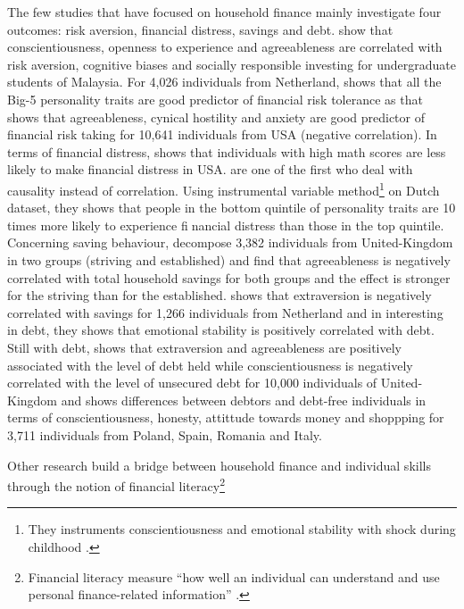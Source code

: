 \documentclass[a4paper, 11pt, onecolumn]{article}
\begin{document}
The few studies that have focused on household finance mainly investigate four outcomes: risk aversion, financial distress, savings and debt.
\cite{Nga2013} show that conscientiousness, openness to experience and agreeableness are correlated with risk aversion, cognitive biases and socially responsible investing for undergraduate students of Malaysia.
For 4,026 individuals from Netherland, \cite{Pinjisakikool2017} shows that all the Big-5 personality traits are good predictor of financial risk tolerance as \cite{Bucciol2017} that shows that agreeableness, cynical hostility and anxiety are good predictor of financial risk taking for 10,641 individuals from USA (negative correlation).
In terms of financial distress, \cite{Agarwal2013} shows that individuals with high math scores are less likely to make financial distress in USA.
\cite{Parise2019} are one of the first who deal with causality instead of correlation.
Using instrumental variable method\footnote{They instruments conscientiousness and emotional stability with shock during childhood .} on Dutch dataset, they shows that people in the bottom quintile of personality traits are 10 times more likely to experience financial distress than those in the top quintile.
Concerning saving behaviour, \cite{Gerhard2018} decompose 3,382 individuals from United-Kingdom in two groups (striving and established) and find that agreeableness is negatively correlated with total household savings for both groups and the effect is stronger for the striving than for the established.
\cite{Nyhus} shows that extraversion is negatively correlated with savings for 1,266 individuals from Netherland and in interesting in debt, they shows that emotional stability is positively correlated with debt.
Still with debt, \cite{Brown2014} shows that extraversion and agreeableness are positively associated with the level of debt held while conscientiousness is negatively correlated with the level of unsecured debt for 10,000 individuals of United-Kingdom and \cite{Forlicz2019} shows differences between debtors and debt-free individuals in terms of conscientiousness, honesty, attittude towards money and shoppping for 3,711 individuals from Poland, Spain, Romania and Italy.

Other research build a bridge between household finance and individual skills through the notion of financial literacy\footnote{Financial literacy measure ``how well an individual can understand and use personal finance-related information'' \citep{Huston2010}.} \citep{Hastings2013} \citep{Gaurav2012} \citep{Klapper2012}
\end{document}
